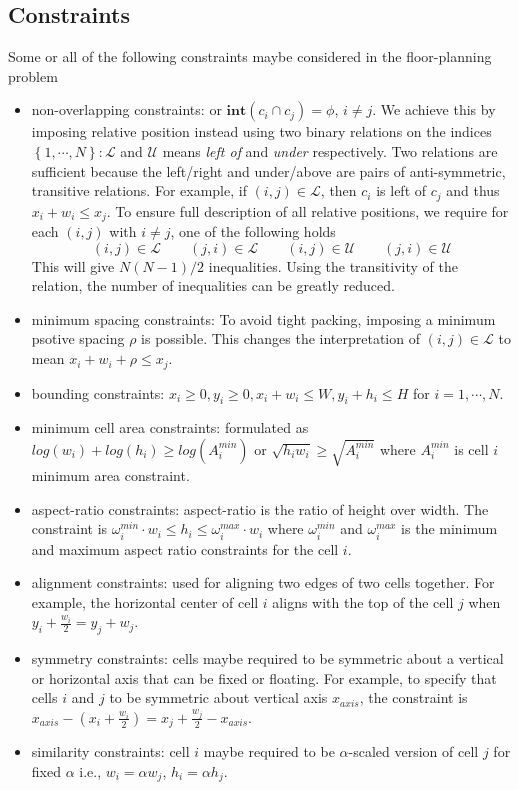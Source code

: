 \documentclass[12pt] {article}
\begin{document}
\subsection*{Constraints}
Some or all of the following constraints maybe considered in the floor-planning problem
\begin{itemize}
\item non-overlapping constraints: or $\textbf{int}(c_{i}\cap c_{j})=\phi$, $i \neq j $. We achieve this by imposing relative position instead using two binary relations on the indices $\left\lbrace 1,\cdots, N \right\rbrace : \mathscr{L}$ and  $\mathscr{U}$ means \emph{left of} and \emph{under} respectively. Two relations are sufficient because the left/right and under/above are pairs of anti-symmetric, transitive relations. For example, if $(i,j)\in \mathscr{L}$, then $c_{i}$ is left of $c_{j}$ and thus $x_{i}+w_{i}\leq x_{j}$. To ensure full description of all relative positions, we require for each $(i,j)$ with $i\neq j$, one of the following holds 
$$(i,j)\in \mathscr{L} \qquad (j,i)\in \mathscr{L} \qquad (i,j)\in \mathscr{U} \qquad (j,i)\in \mathscr{U} $$
This will give $N(N-1)/2$ inequalities. Using the transitivity of the relation, the number of inequalities can be greatly reduced.

\item minimum spacing constraints: To avoid tight packing, imposing a minimum psotive spacing $\rho$ is possible. This changes the interpretation of $(i,j)\in \mathscr{L}$ to mean $x_{i}+w_{i}+\rho \leq x_{j}$. 
\item bounding constraints: $x_{i}\geq0, y_{i}\geq0, x_{i}+w_{i}\leq W, y_{i}+h_{i}\leq H$ for $i=1,\cdots, N$. 
\item minimum cell area constraints: formulated as $log(w_{i})+log(h_{i}) \geq log(A_{i}^{min})$ or $\sqrt{h_{i}w_{i}}\geq \sqrt{A_{i}^{min}}$ where $A_{i}^{min}$ is cell $i$ minimum area constraint. 
\item aspect-ratio constraints: aspect-ratio is the ratio of height over width. The constraint is $\omega_{i}^{min}\cdot w_{i}\leq h_{i} \leq \omega_{i}^{max}\cdot w_{i}$ where $\omega_{i}^{min}$ and $\omega_{i}^{max}$ is the minimum and maximum aspect ratio constraints for the cell $i$.
\item alignment constraints: used for aligning two edges of two cells together. For example, the horizontal center of cell $i$ aligns with the top of the cell $j$ when $y_{i}+\frac{w_{i}}{2}=y_{j}+w_{j}$.
\item symmetry constraints: cells maybe required to be symmetric about a vertical or horizontal axis that can be  fixed or floating. For example, to specify that cells $i$ and $j$ to be symmetric about vertical axis $x_{axis}$, the constraint is $x_{axis}-(x_{i}+\frac{w_{i}}{2}) = x_{j}+\frac{w_{j}}{2}-x_{axis}$.
\item similarity constraints: cell $i$ maybe required to be $\alpha$-scaled version of cell $j$ for fixed $\alpha$ i.e., $w_{i}=\alpha w_{j}$, $h_{i}=\alpha h_{j}$. 


\end{itemize}
\end{document}

